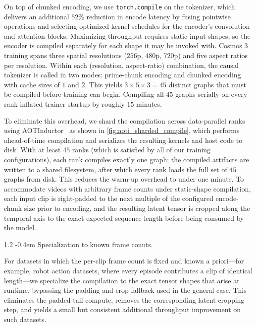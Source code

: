\documentclass{llmxive}
\makeatletter
\providecommand{\paragraph}{  \@startsection{paragraph}{4}{\z@}    {1\baselineskip \@plus .2\baselineskip}    {-0.4em}    {\normalfont\normalsize\bfseries}}
\makeatother
\begin{document}
On top of chunked encoding, we use \texttt{torch.compile} on the tokenizer, which delivers an additional $52\%$ reduction in encode latency by fusing pointwise operations and selecting optimized kernel schedules for the encoder's convolution and attention blocks. Maximizing throughput requires static input shapes, so the encoder is compiled separately for each shape it may be invoked with. Cosmos 3 training spans three spatial resolutions ($256\text{p}$, $480\text{p}$, $720\text{p}$) and five aspect ratios per resolution. Within each (resolution, aspect-ratio) combination, the causal tokenizer is called in two modes: prime-chunk encoding and chunked encoding with cache sizes of $1$ and $2$. This yields $3 \times 5 \times 3 = 45$ distinct graphs that must be compiled before training can begin. Compiling all $45$ graphs serially on every rank inflated trainer startup by roughly $15$ minutes.

To eliminate this overhead, we shard the compilation across data-parallel ranks using AOTInductor~\citep{pytorch_aot_inductor} as shown in \cref{fig:aoti_sharded_compile}, which performs ahead-of-time compilation and serializes the resulting kernels and host code to disk. With at least $45$ ranks (which is satisfied by all of our training configurations), each rank compiles exactly one graph; the compiled artifacts are written to a shared filesystem, after which every rank loads the full set of $45$ graphs from disk. This reduces the warm-up overhead to under one minute. To accommodate videos with arbitrary frame counts under static-shape compilation, each input clip is right-padded to the next multiple of the configured encode-chunk size prior to encoding, and the resulting latent tensor is cropped along the temporal axis to the exact expected sequence length before being consumed by the model.

\paragraph{Specialization to known frame counts.}

For datasets in which the per-clip frame count is fixed and known a priori---for example, robot action datasets, where every episode contributes a clip of identical length---we specialize the compilation to the exact tensor shapes that arise at runtime, bypassing the padding-and-crop fallback used in the general case. This eliminates the padded-tail compute, removes the corresponding latent-cropping step, and yields a small but consistent additional throughput improvement on such datasets.
\end{document}
